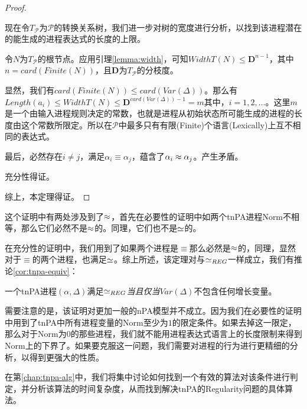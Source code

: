 \begin{proof}
\begin{itemize}
现在令$T_{\mathcal{P}}$为$\mathcal{P}$的转换关系树，我们进一步对树的宽度进行分析，以找到该进程潜在的能生成的进程表达式的长度的上限。

令$N$为$T_{\mathcal{P}}$的根节点。应用引理\ref{lemma:width}，可知$WidthT(N)\leq \mathbf{D}^{n-1}$，其中$n=card(Finite(N))$，且$\mathbf{D}$为$T_{\mathcal{P}}$的分枝度。

显然，我们有$card(Finite(N))\leq card(Var(\Delta))$。那么有$Length(a_i)\leq WidthT(N)\leq \mathbf{D}^{card(Var(\Delta))-1}=m$其中，$i=1,2,\ldots$。这里$m$是一个由输入进程规则决定的常数，也就是进程从初始状态所可能生成的进程的长度由这个常数所限定。所以在$\mathcal{P}$中最多只有有限(Finite)个语言(Lexically)上互不相同的表达式。

最后，必然存在$i\neq j$，满足$\alpha_i\equiv \alpha_j$，蕴含了$\alpha_i\approx \alpha_j$。产生矛盾。

充分性得证。
\end{itemize}
综上，本定理得证。
\end{proof}

这个证明中有两处涉及到了$\approx$，首先在必要性的证明中如两个tnPA进程Norm不相等，那么它们必然不是$\approx$的。同理，它们也不是$\simeq$的。

在充分性的证明中，我们用到了如果两个进程是$\equiv$那么必然是$\approx$的，同理，显然对于$\equiv$的两个进程，也满足$\simeq$。综上所述，该定理对与$\simeq_{REG}$一样成立，我们有推论\ref{cor:tnpa-equiv}：

\begin{cor}\label{cor:tnpa-equiv}
一个tnPA进程$(\alpha,\Delta)$满足$\simeq_{REG}$\emph{当且仅当}$Var(\Delta)$不包含任何增长变量。
\end{cor}

需要注意的是，该证明对更加一般的nPA模型并不成立。因为我们在必要性的证明中用到了tnPA中所有进程变量的Norm至少为$1$的限定条件。如果去掉这一限定，那么对于Norm为$0$的那些进程，我们就不能用进程表达式语言上的长度限制来得到Norm上的下界了。如果要克服这一问题，我们需要对进程的行为进行更精细的分析，以得到更强大的性质。

在第\ref{chap:tnpa-alg}中，我们将集中讨论如何找到一个有效的算法对该条件进行判定，并分析该算法的时间复杂度，从而找到解决tnPA的Regularity问题的具体算法。

